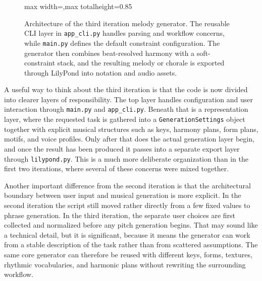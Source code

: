 \begin{figure}[htbp]
\begin{adjustbox}{max width=\textwidth,max totalheight=0.85\textheight}
%
    \end{adjustbox}
    \caption{Architecture of the third iteration melody generator. The reusable CLI layer in \texttt{app\_cli.py} handles parsing and workflow concerns, while \texttt{main.py} defines the default constraint configuration. The generator then combines beat-resolved harmony with a soft-constraint stack, and the resulting melody or chorale is exported through LilyPond into notation and audio assets.}\label{fig:iter3_architecture}
  \end{figure}

  A useful way to think about the third iteration is that the code is now divided into clearer layers of responsibility. The top layer handles configuration and user interaction through \texttt{main.py} and \texttt{app\_cli.py}. Beneath that is a representation layer, where the requested task is gathered into a \texttt{GenerationSettings} object together with explicit musical structures such as keys, harmony plans, form plans, motifs, and voice profiles. Only after that does the actual generation layer begin, and once the result has been produced it passes into a separate export layer through \texttt{lilypond.py}. This is a much more deliberate organization than in the first two iterations, where several of these concerns were mixed together.

  Another important difference from the second iteration is that the architectural boundary between user input and musical generation is more explicit. In the second iteration the script still moved rather directly from a few fixed values to phrase generation. In the third iteration, the separate user choices are first collected and normalized before any pitch generation begins. That may sound like a technical detail, but it is significant, because it means the generator can work from a stable description of the task rather than from scattered assumptions. The same core generator can therefore be reused with different keys, forms, textures, rhythmic vocabularies, and harmonic plans without rewriting the surrounding workflow.



